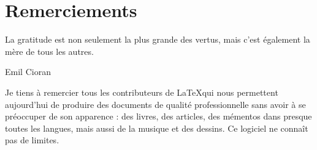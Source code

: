 
\chapter{Remerciements}
\epigraph{La gratitude est non seulement la plus grande des vertus, mais c'est également la mère de tous les autres.}{Emil Cioran}

Je tiens à remercier tous les contributeurs de \LaTeX qui nous permettent aujourd'hui de produire des documents de qualité professionnelle sans avoir à se préoccuper de son apparence : des livres, des articles, des mémentos dans presque toutes les langues, mais aussi de la musique et des dessins. Ce logiciel ne connaît pas de limites.
 
